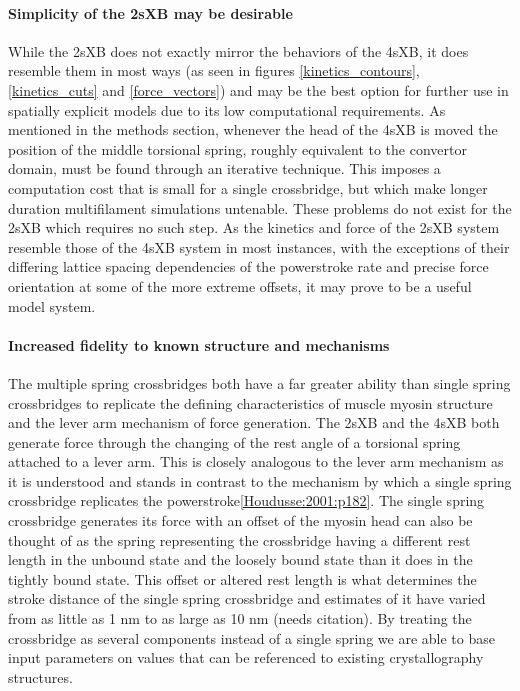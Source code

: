 \documentclass[]{article}
\begin{document}
\paragraph{Simplicity of the 2sXB may be desirable} %
While the 2sXB does not exactly mirror the behaviors of the 4sXB, it does resemble them in most ways (as seen in figures \ref{kinetics_contours}, \ref{kinetics_cuts} and \ref{force_vectors}) and may be the best option for further use in spatially explicit models due to its low computational requirements.
As mentioned in the methods section, whenever the head of the 4sXB is moved the position of the middle torsional spring, roughly equivalent to the convertor domain, must be found through an iterative technique. 
This imposes a computation cost that is small for a single crossbridge, but which make longer duration multifilament simulations untenable. 
These problems do not exist for the 2sXB which requires no such step.
As the kinetics and force of the 2sXB system resemble those of the 4sXB system in most instances, with the exceptions of their differing lattice spacing dependencies of the powerstroke rate and precise force orientation at some of the more extreme offsets, it may prove to be a useful model system.

\paragraph{Increased fidelity to known structure and mechanisms} %
The multiple spring crossbridges both have a far greater ability than single spring crossbridges to replicate the defining characteristics of muscle myosin structure and the lever arm mechanism of force generation. 
The 2sXB and the 4sXB both generate force through the changing of the rest angle of a torsional spring attached to a lever arm.
This is closely analogous to the lever arm mechanism as it is understood and stands in contrast to the mechanism by which a single spring crossbridge replicates the powerstroke\ref{Houdusse:2001:p182}.
The single spring crossbridge generates its force with an offset of the myosin head can also be thought of as the spring representing the crossbridge having a different rest length in the unbound state and the loosely bound state than it does in the tightly bound state. 
This offset or altered rest length is what determines the stroke distance of the single spring crossbridge and estimates of it have varied from as little as 1 nm to as large as 10 nm (needs citation). 
By treating the crossbridge as several components instead of a single spring we are able to base input parameters on values that can be referenced to existing crystallography structures.
\end{document}
